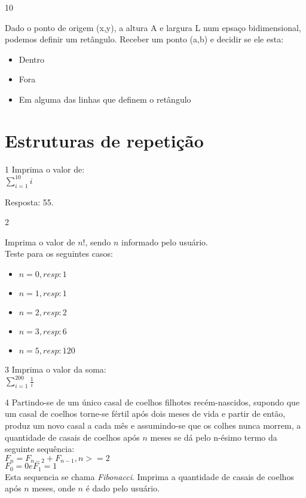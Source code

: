 \begin{exercicio}
  {10}
  {Dado o ponto de origem (x,y), a altura A e largura L num epsaço bidimensional, podemos definir um retângulo. Receber um ponto (a,b) e decidir se ele esta:
  \begin{itemize}
    \item Dentro
    \item Fora 
    \item Em alguma das linhas que definem o retângulo
  \end{itemize}}
\end{exercicio}

\section{Estruturas de repetição}
\begin{exercicio}
  {1}
  {Imprima o valor de: \\
  $\sum\limits_{i=1}^{10} i$}
  
  Resposta: 55.
\end{exercicio}

\begin{exercicio}
  {2}
  {Imprima o valor de $n!$, sendo $n$ informado pelo usuário. \\
  Teste para os seguintes casos: \\
  \begin{itemize}
    \item $n = 0, resp: 1$
    \item $n = 1, resp: 1$
    \item $n = 2, resp: 2$
    \item $n = 3, resp: 6$
    \item $n = 5, resp: 120$
  \end{itemize}}
\end{exercicio}

\begin{exercicio}
  {3}
  {Imprima o valor da soma: \\
  $\sum\limits_{i=1}^{200} \frac{1}{i}$}
\end{exercicio}

\begin{exercicio}
  {4}
  {Partindo-se de um único casal de coelhos filhotes recém-nascidos, supondo que um casal de coelhos torne-se fértil após dois meses de vida e partir de então, produz um novo casal a cada mês e assumindo-se que os colhes nunca morrem, a quantidade de casais de coelhos após $n$ meses se dá pelo n-ésimo termo da seguinte sequência: \\
  $F_{n} = F_{n-2} + F_{n-1}, n>=2$ \\
  $F_{0} = 0  e F_{1} = 1$ \\
  Esta sequencia se chama \textit{Fibonacci}. Imprima a quantidade de casais de coelhos após $n$ meses, onde $n$ é dado pelo usuário.}
\end{exercicio}

